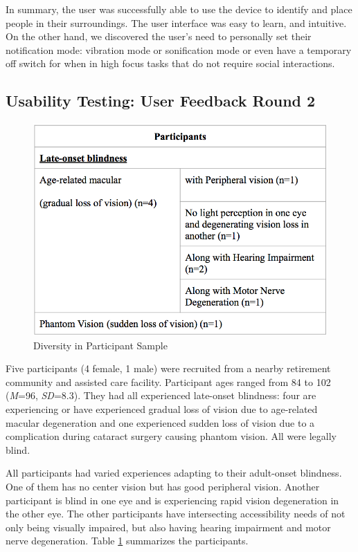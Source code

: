 In summary, the user was successfully able to use the device to identify and place people in their surroundings. The user interface was easy to learn, and intuitive. On the other hand, we discovered the user's need to personally set their notification mode: vibration mode or sonification mode or even have a temporary off switch for when in high focus tasks that do not require social interactions. 

\subsection{Usability Testing: User Feedback Round 2}

\begin{figure}[htbp]
  \centering
  \includegraphics[width=\columnwidth]{figures/participants.png}
  \caption{Diversity in Participant Sample}
  \label{table:participants}
\end{figure}

Five participants (4 female, 1 male) were recruited from a nearby retirement community and assisted care facility. Participant ages ranged from 84 to 102 (\textit{M}=96, \textit{SD}=8.3). They had all experienced late-onset blindness: four are experiencing or have experienced gradual loss of vision due to age-related macular degeneration and one experienced sudden loss of vision due to a complication during cataract surgery causing phantom vision. All were legally blind. 

All participants had varied experiences adapting to their adult-onset blindness. One of them has no center vision but has good peripheral vision. Another participant is blind in one eye and is experiencing rapid vision degeneration in the other eye. The other participants have intersecting accessibility needs of not only being visually impaired, but also having hearing impairment and motor nerve degeneration. Table \ref{table:participants} summarizes the participants.

